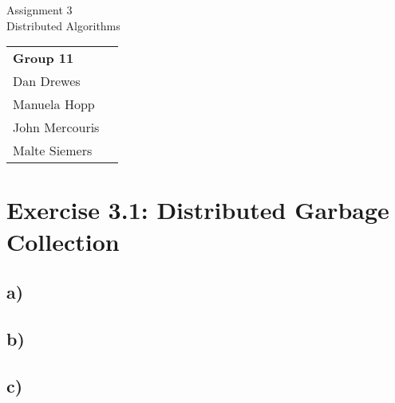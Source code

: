 \documentclass[12pt,a4paper]{article}
\begin{document}
\begin{center}
  \Large Assignment 3 \\
  \large Distributed Algorithms
\end{center}
\begin{flushright}
  \begin{tabular}{ll}
    \textbf{Group 11} \\
    Dan Drewes        \\ 
    Manuela Hopp      \\ 
    John Mercouris    \\
    Malte Siemers     \\
  \end{tabular} 
\end{flushright}

\section*{Exercise 3.1: Distributed Garbage Collection}
  \subsection*{a)} %
  \subsection*{b)} %
  \subsection*{c)} %
\end{document}

